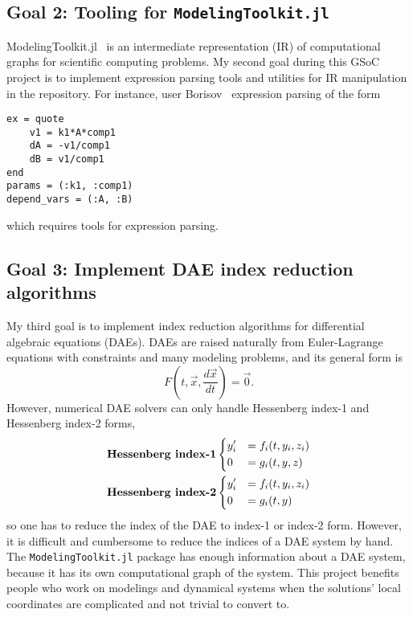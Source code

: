 \documentclass[12pt]{article}
\begin{document}
\subsection{Goal 2: Tooling for \texttt{ModelingToolkit.jl}}
ModelingToolkit.jl~\cite{modelingtoolkit} is an intermediate representation
(IR) of computational graphs for scientific computing problems. My second goal
during this GSoC project is to implement expression parsing tools and utilities
for IR manipulation in the repository. For instance, user
Borisov~\cite{parsing} expression parsing of the form
\begin{lstlisting}
ex = quote
    v1 = k1*A*comp1
    dA = -v1/comp1
    dB = v1/comp1
end
params = (:k1, :comp1)
depend_vars = (:A, :B)
\end{lstlisting}
which requires tools for expression parsing.

\subsection{Goal 3: Implement DAE index reduction algorithms}
My third goal is to implement index reduction algorithms for differential
algebraic equations (DAEs). DAEs are raised naturally from Euler-Lagrange
equations with constraints and many modeling problems, and its general form is
\begin{equation}
  F(t, \vec{x}, \frac{d\vec{x}}{dt}) = \vec{0}.
\end{equation}
However, numerical DAE solvers can only handle Hessenberg index-1 and
Hessenberg index-2 forms,
\begin{align}
  &\textbf{Hessenberg index-1}
  \begin{dcases}
    y_i' &= f_i(t,y_i,z_i)\\
    0 &= g_i(t,y,z)
  \end{dcases}\\
  &\textbf{Hessenberg index-2}
  \begin{dcases}
    y'_i &= f_i(t,y_i,z_i)\\
    0 &= g_i(t,y)
  \end{dcases}
\end{align}
so one has to reduce the index of the DAE to index-1 or index-2 form. However,
it is difficult and cumbersome to reduce the indices of a DAE system by hand.
The \texttt{ModelingToolkit.jl} package has enough information about a DAE system,
because it has its own computational graph of the system. This project benefits
people who work on modelings and dynamical systems when the solutions' local
coordinates are complicated and not trivial to convert to.
\end{document}
